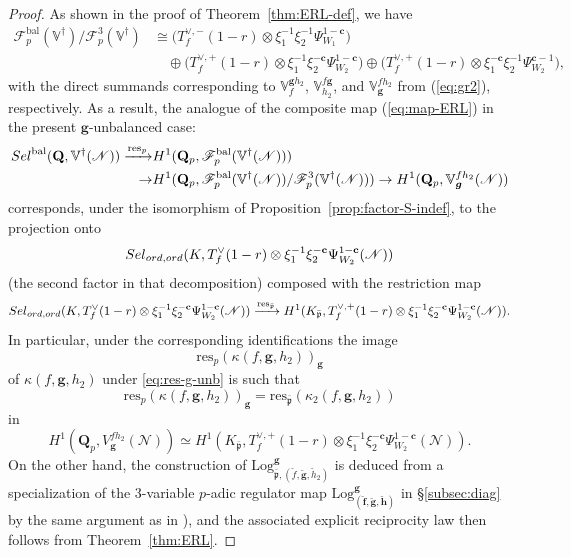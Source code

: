 \documentclass[10pt,letterpaper]{amsart}
\theoremstyle{plain}
\theoremstyle{definition}
\theoremstyle{definition}
\theoremstyle{plain}
\theoremstyle{plain}
\theoremstyle{plain}
\theoremstyle{remark}
\numberwithin{equation}{section}
\newcommand{\cc}{\mathbf{c}}
\newcommand{\ch}{\xi}
\newcommand{\Sel}{Sel}
\newcommand{\rH}{H}
\newcommand{\ppbar}{\bar{\mathfrak{p}}}
\newcommand{\ord}{{{\rm ord},{\rm ord}}}
\DeclareMathOperator{\bal}{\mathrm{bal}}
\newcommand{\VVdag}{{\mathbb{V}^\dagger}}
\newcommand{\Q}{\mathbf{Q}}
\def\Sel{{\rm Sel}}
\newcommand{\bff}{{\boldsymbol{f}}}
\newcommand{\bfg}{{\boldsymbol{g}}}
\newcommand{\bfh}{{\boldsymbol{h}}}
\begin{document}
\begin{proof}
As shown in the proof of Theorem~\ref{thm:ERL-def}, we have
\begin{align*}
\mathscr{F}_p^{\bal}(\VVdag)/\mathscr{F}_p^3(\VVdag)&\cong
\bigl(T_f^{\vee,-}(1-r)\otimes\ch_1^{-1}\ch_2^{-1}\Psi_{W_1}^{1-\cc}\bigr)\\
&\quad\oplus\bigl(T_f^{\vee,+}(1-r)\otimes\ch_1^{-1}\ch_2^{-\cc}\Psi_{W_2}^{1-\cc}\bigr)\oplus\bigl(T_f^{\vee,+}(1-r)\otimes\ch_1^{-\cc}\ch_2^{-1}\Psi_{W_2}^{\cc-1}\bigr),
\end{align*}
with the direct summands corresponding to $\mathbb{V}_{f}^{\bfg h_2}$, $\mathbb{V}_{h_2}^{f\bfg}$, and $\mathbb{V}_{\bfg}^{fh_2}$ from (\ref{eq:gr2}), respectively. As a result, the analogue of the composite map (\ref{eq:map-ERL}) in the present $\bfg$-unbalanced case:
\begin{equation}\label{eq:res-g-unb}
\begin{aligned}
\Sel^{\bal}(\Q,\VVdag(\mathscr{N}))\xrightarrow{{\mathrm{res}}_p}&\rH^1(\Q_p,\mathscr{F}_p^{\bal}(\VVdag(\mathscr{N})))\\ \rightarrow &\rH^1(\Q_p,\mathscr{F}_p^{\bal}(\VVdag(\mathscr{N}))/\mathscr{F}_p^3(\VVdag(\mathscr{N})))
\rightarrow\rH^1(\Q_p,\mathbb{V}_{\bfg}^{fh_2}(\mathscr{N}))
\end{aligned}
\end{equation} 
corresponds, under the isomorphism of Proposition~\ref{prop:factor-S-indef}, to the projection onto \[\Sel_{\ord}(K,T_f^{\vee}(1-r)\otimes\ch_1^{-1}\ch_2^{-\cc}\Psi_{W_2}^{1-\cc}(\mathscr{N}))\] (the second factor in that decomposition) composed with the restriction map
\[
\Sel_{\ord}(K,T_f^{\vee}(1-r)\otimes\ch_1^{-1}\ch_2^{-\cc}\Psi_{W_2}^{1-\cc}(\mathscr{N}))\xrightarrow{{\mathrm{res}}_{\ppbar}}\rH^1(K_{\ppbar},T_f^{\vee,+}(1-r)\otimes\ch_1^{-1}\ch_2^{-\cc}\Psi_{W_2}^{1-\cc}(\mathscr{N})).
\]
In particular, under the corresponding identifications the image \[{\mathrm{res}}_p(\kappa(f,\bfg,h_2))_\bfg\] of $\kappa(f,\bfg,h_2)$ under \eqref{eq:res-g-unb} is such that 
\[{\mathrm{res}}_p(\kappa(f,\bfg,h_2))_\bfg={\mathrm{res}}_{\ppbar}(\kappa_2(f,\bfg,h_2))\] 
in
\[
\rH^1(\Q_p,V_\bfg^{fh_2}(\mathscr{N}))\simeq\rH^1(K_{\ppbar},T_f^{\vee,+}(1-r)\otimes\ch_1^{-1}\ch_2^{-\cc}\Psi_{W_2}^{1-\cc}(\mathscr{N})).
\] 
On the other hand, the construction of ${\mathrm{Log}}^{\bfg}_{\ppbar,(\breve{f},\breve{\bfg},\breve{h}_2)}$ is deduced from a specialization of the $3$-variable $p$-adic regulator map ${\mathrm{Log}}_{(\breve{\bff},\breve{\bfg},\breve{\bfh})}^{\bfg}$ in \S\ref{subsec:diag} by the same argument as in \cite[Prop.~7.3]{ACR}), and the associated explicit reciprocity law then follows from Theorem~\ref{thm:ERL}.
\end{proof}
\end{document}
